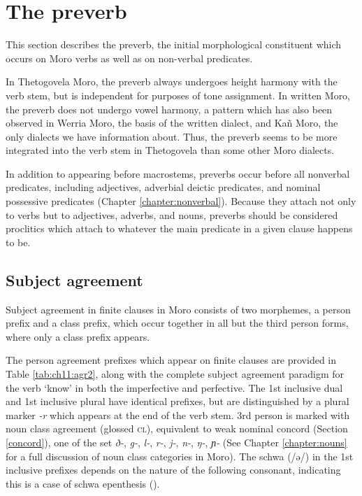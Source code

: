 \section{The preverb}\label{sec:ch11:preverb}

This section describes the preverb, the initial morphological constituent which occurs on Moro verbs as well as on non-verbal predicates. 

In Thetogovela Moro, the preverb always undergoes height harmony with the verb stem, but is independent for purposes of tone assignment. In written Moro, the preverb does not undergo vowel harmony, a pattern which has also been observed in Werria Moro, the basis of the written dialect, and Ka\~n Moro, the only dialects we have information about. Thus, the preverb seems to be more integrated into the verb stem in Thetogovela than some other Moro dialects. %

In addition to appearing before macrostems, preverbs occur before all nonverbal predicates, including adjectives, adverbial deictic predicates, and nominal possessive predicates (Chapter \ref{chapter:nonverbal}). Because they attach not only to verbs but to adjectives, adverbs, and nouns, preverbs should be considered proclitics which attach to whatever the main predicate in a given clause happens to be.

\subsection{Subject agreement}\label{sec:ch11:subjectagreement}

Subject agreement in finite clauses in Moro consists of two morphemes, a person prefix and a class prefix, which occur together in all but the third person forms, where only a class prefix appears.

The person agreement prefixes which appear on finite clauses are provided in Table \ref{tab:ch11:agr2}, along with the complete subject agreement paradigm for the verb ‘know’ in both the imperfective and perfective. The 1st inclusive dual and 1st inclusive plural have identical prefixes, but are distinguished by a plural marker \textit{-r} which appears at the end of the verb stem. 3rd person is marked with noun class agreement (glossed \textsc{cl}), equivalent to weak nominal concord (Section \ref{concord}), one of the set \textit{ð-}, \textit{g-}, \textit{l-}, \textit{r-}, \textit{j-}, \textit{n-}, \textit{ŋ-}, \textit{ɲ-} (See Chapter \ref{chapter:nouns} for a full discussion of noun class categories in Moro). The schwa (/ə/) in the 1st inclusive prefixes depends on the nature of the following consonant, indicating this is a case of schwa epenthesis (). 

